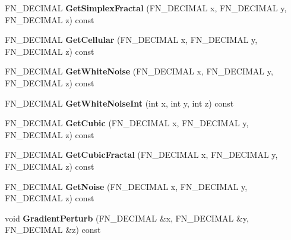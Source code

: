 \begin{DoxyCompactItemize}
\mbox{\label{classFastNoise_a56b14e348cf0762010e6c58b6f5243f9}} 
F\+N\+\_\+\+D\+E\+C\+I\+M\+AL {\bfseries Get\+Simplex\+Fractal} (F\+N\+\_\+\+D\+E\+C\+I\+M\+AL x, F\+N\+\_\+\+D\+E\+C\+I\+M\+AL y, F\+N\+\_\+\+D\+E\+C\+I\+M\+AL z) const
\item 
\mbox{\label{classFastNoise_ae495c40690f86b4bf178580f1076a3a6}} 
F\+N\+\_\+\+D\+E\+C\+I\+M\+AL {\bfseries Get\+Cellular} (F\+N\+\_\+\+D\+E\+C\+I\+M\+AL x, F\+N\+\_\+\+D\+E\+C\+I\+M\+AL y, F\+N\+\_\+\+D\+E\+C\+I\+M\+AL z) const
\item 
\mbox{\label{classFastNoise_a661febd01ba99e06b9de5fab9bd13fb0}} 
F\+N\+\_\+\+D\+E\+C\+I\+M\+AL {\bfseries Get\+White\+Noise} (F\+N\+\_\+\+D\+E\+C\+I\+M\+AL x, F\+N\+\_\+\+D\+E\+C\+I\+M\+AL y, F\+N\+\_\+\+D\+E\+C\+I\+M\+AL z) const
\item 
\mbox{\label{classFastNoise_a1c0a782e7675a58f6fe777eb6fa06eaf}} 
F\+N\+\_\+\+D\+E\+C\+I\+M\+AL {\bfseries Get\+White\+Noise\+Int} (int x, int y, int z) const
\item 
\mbox{\label{classFastNoise_a08d9997db49e1f7d536a6502e29cb2b8}} 
F\+N\+\_\+\+D\+E\+C\+I\+M\+AL {\bfseries Get\+Cubic} (F\+N\+\_\+\+D\+E\+C\+I\+M\+AL x, F\+N\+\_\+\+D\+E\+C\+I\+M\+AL y, F\+N\+\_\+\+D\+E\+C\+I\+M\+AL z) const
\item 
\mbox{\label{classFastNoise_a5a3c112c87fc2d8ca89e16332538c71a}} 
F\+N\+\_\+\+D\+E\+C\+I\+M\+AL {\bfseries Get\+Cubic\+Fractal} (F\+N\+\_\+\+D\+E\+C\+I\+M\+AL x, F\+N\+\_\+\+D\+E\+C\+I\+M\+AL y, F\+N\+\_\+\+D\+E\+C\+I\+M\+AL z) const
\item 
\mbox{\label{classFastNoise_a0d9b7a6858a599cde4dc5b8f74264ae0}} 
F\+N\+\_\+\+D\+E\+C\+I\+M\+AL {\bfseries Get\+Noise} (F\+N\+\_\+\+D\+E\+C\+I\+M\+AL x, F\+N\+\_\+\+D\+E\+C\+I\+M\+AL y, F\+N\+\_\+\+D\+E\+C\+I\+M\+AL z) const
\item 
\mbox{\label{classFastNoise_a24007877680a6d0f45ea1d7f209ee6f1}} 
void {\bfseries Gradient\+Perturb} (F\+N\+\_\+\+D\+E\+C\+I\+M\+AL \&x, F\+N\+\_\+\+D\+E\+C\+I\+M\+AL \&y, F\+N\+\_\+\+D\+E\+C\+I\+M\+AL \&z) const
\item 

\end{DoxyCompactItemize}
